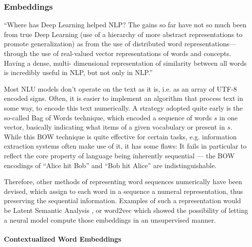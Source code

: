 \subsubsection*{Embeddings}

{\color{red} ``Where has Deep Learning helped NLP? The gains so far have not so much been from
true Deep Learning (use of a hierarchy of more abstract representations to promote
generalization) as from the use of distributed word representations—through the use
of real-valued vector representations of words and concepts. Having a dense, multi-
dimensional representation of similarity between all words is incredibly useful in NLP,
but not only in NLP.'' \citep[p.~703]{manning2015computational}}

Most NLU models don't operate on the text as it is, i.e. as an array of UTF-8 encoded
signs. Often, it is easier to implement an algorithm that process text in some way, to
encode this text numerically. A strategy adopted quite early is the so-called Bag of
Words \citep{harris1954distributional} technique, which encoded a sequence of words $s$
in one vector, basically indicating what items of a given vocabulary or present in $s$.
While this BOW technique is quite effective for certain tasks, e.g. information extraction
systems often make use of it, it has some flaws: It fails in particular to reflect the core
property of language being inherently sequential --- the BOW encodings of ``Alice hit Bob''
and ``Bob hit Alice'' are indistinguishable.

Therefore, other methods of representing word sequences numerically have been devised, which assign
to each word in a sequence a numeral representation, thus preserving the sequential information.
Examples of such a representation would be Latent Semantic Analysis \citep{furnas1988using}, or
word2vec \citep{mikolov2013distributed} which showed the possibility of letting a neural model
compute those embeddings in an unsupervised manner.


\paragraph*{Contextualized Word Embeddings}

